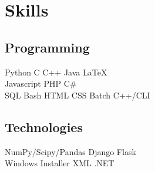 \documentclass[letterpaper]{deedy-resume} %
\begin{document}
\begin{minipage}[t]{0.33\textwidth}
\sectionspace %


\section{Skills}

\subsection{Programming}

Python \textbullet{} C \textbullet{} C++ \textbullet{} Java \textbullet{} \LaTeX \\
Javascript \textbullet{} PHP \textbullet{} C\# \\
SQL \textbullet{} Bash \textbullet{} HTML \textbullet{} CSS \textbullet{} Batch \textbullet{} C++/CLI

\sectionspace %

\subsection{Technologies}

NumPy/Scipy/Pandas \textbullet{} Django \textbullet{} Flask \\
Windows Installer XML \textbullet{} .NET \textbullet{}


\end{minipage} %
\hfill
%
%
\end{document}
